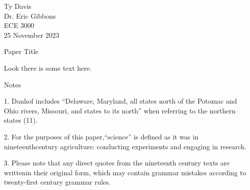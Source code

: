 \documentclass[12pt]{article}
\begin{document}
\begin{flushleft}

Ty Davis\\
Dr. Eric Gibbons\\
ECE 3000\\
25 November 2023\\


\begin{center}
Paper Title
\end{center}

Look there is some text here. \parencite{7842840}


\setlength{\parindent}{0.5in}


\newpage


\begin{center}
Notes
\end{center}


\setlength{\parindent}{0.5in}

1. Danhof includes “Delaware, Maryland, all states north of the Potomac and Ohio rivers, Missouri, and states to its north” when referring to the northern states (11).


2. For the purposes of this paper,“science” is defined as it was in nineteenthcentury agriculture: conducting experiments and engaging in research.


3. Please note that any direct quotes from the nineteenth century texts are writtenin their original form, which may contain grammar mistakes according to twenty-first century grammar rules.







\newpage
\nocite{7878935}
\printbibliography

\end{flushleft}
\end{document}
